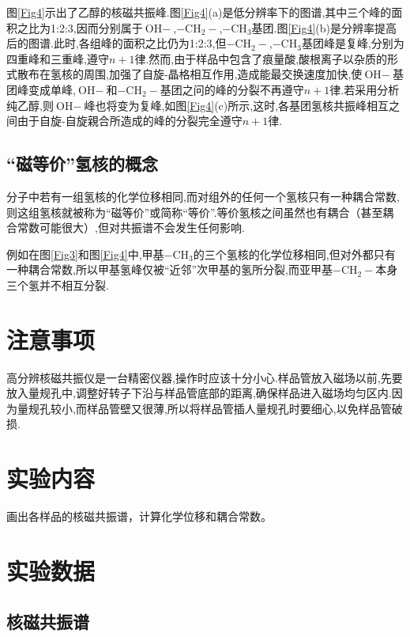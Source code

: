 \documentclass[a4paper]{article}
\begin{document}
图\ref{Fig4}示出了乙醇的核磁共振峰.图\ref{Fig4}(a)是低分辨率下的图谱,其中三个峰的面积之比为1:2:3,因而分别属于$\text{OH}-$,$-\text{CH}_2-$,$-\text{CH}_3$基团.图\ref{Fig4}(b)是分辨率提高后的图谱.此时,各组峰的面积之比仍为1:2:3,但$-\text{CH}_2-$,$-\text{CH}_3$基团峰是复峰,分别为四重峰和三重峰,遵守$n+1$律.然而,由于样品中包含了痕量酸,酸根离子以杂质的形式散布在氢核的周围,加强了自旋-晶格相互作用,造成能最交换速度加快,使$\text{OH}-$基团峰变成单峰,$\text{OH}-$和$-\text{CH}_2-$基团之问的峰的分裂不再遵守$n+1$律.若采用分析纯乙醇,则$\text{OH}-$峰也将变为复峰,如图\ref{Fig4}(c)所示,这时,各基团氢核共振峰相互之间由于自旋-自旋親合所造成的峰的分裂完全遵守$n+1$律.

\subsection{“磁等价”氢核的概念}

分子中若有一组氢核的化学位移相同,而对组外的任何一个氢核只有一种耦合常数,则这组氢核就被称为“磁等价”或简称“等价”.等价氢核之间虽然也有耦合（甚至耦合常数可能很大）,但对共振谱不会发生任何影响.

例如在图\ref{Fig3}和图\ref{Fig4}中,甲基$-\text{CH}_3$的三个氢核的化学位移相同,但对外都只有一种耦合常数,所以甲基氢峰仅被“近邻”次甲基的氢所分裂,而亚甲基$-\text{CH}_2-$本身三个氢并不相互分裂.

\section{注意事项}
高分辨核磁共振仪是一台精密仪器,操作时应该十分小心.样品管放入磁场以前,先要放入量规孔中,调整好转子下沿与样品管底部的距离,确保样品进入磁场均匀区内.因为量规孔较小,而样品管壁又很薄,所以将样品管插人量规孔时要细心,以免样品管破损.

\section{实验内容}
画出各样品的核磁共振谱，计算化学位移和耦合常数。

\newpage

\section{实验数据}
\subsection{核磁共振谱}
\end{document}
